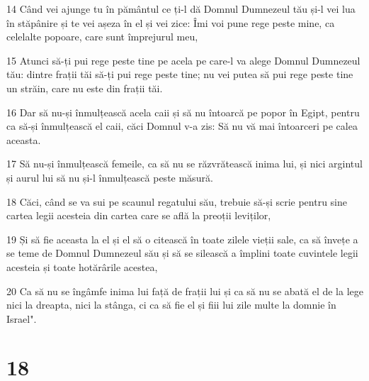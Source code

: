 \par 14 Când vei ajunge tu în pământul ce ți-l dă Domnul Dumnezeul tău și-l vei lua în stăpânire și te vei așeza în el și vei zice: Îmi voi pune rege peste mine, ca celelalte popoare, care sunt împrejurul meu,
\par 15 Atunci să-ți pui rege peste tine pe acela pe care-l va alege Domnul Dumnezeul tău: dintre frații tăi să-ți pui rege peste tine; nu vei putea să pui rege peste tine un străin, care nu este din frații tăi.
\par 16 Dar să nu-și înmulțească acela caii și să nu întoarcă pe popor în Egipt, pentru ca să-și înmulțească el caii, căci Domnul v-a zis: Să nu vă mai întoarceri pe calea aceasta.
\par 17 Să nu-și înmulțească femeile, ca să nu se răzvrătească inima lui, și nici argintul și aurul lui să nu și-l înmulțească peste măsură.
\par 18 Căci, când se va sui pe scaunul regatului său, trebuie să-și scrie pentru sine cartea legii acesteia din cartea care se află la preoții leviților,
\par 19 Și să fie aceasta la el și el să o citească în toate zilele vieții sale, ca să învețe a se teme de Domnul Dumnezeul său și să se silească a împlini toate cuvintele legii acesteia și toate hotărârile acestea,
\par 20 Ca să nu se îngâmfe inima lui față de frații lui și ca să nu se abată el de la lege nici la dreapta, nici la stânga, ci ca să fie el și fiii lui zile multe la domnie în Israel".

\chapter{18}

